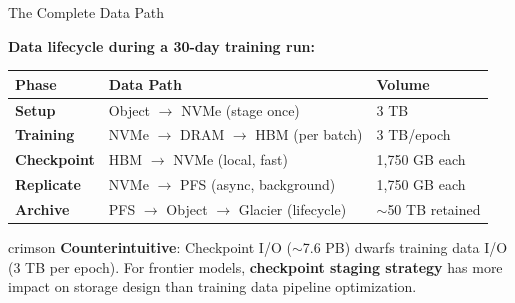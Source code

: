 \documentclass[aspectratio=169, 12pt]{beamer}
\begin{document}
\begin{frame}{The Complete Data Path}

\footnotesize
\textbf{Data lifecycle during a 30-day training run:}

\vspace{0.1cm}
\renewcommand{\arraystretch}{1.1}
{\scriptsize
\begin{tabular}{@{}lll@{}}
  \toprule
  \textbf{Phase} & \textbf{Data Path} & \textbf{Volume} \\
  \midrule
  \textbf{Setup}     & Object $\to$ NVMe (stage once)            & 3 TB \\
  \textbf{Training}  & NVMe $\to$ DRAM $\to$ HBM (per batch)     & 3 TB/epoch \\
  \textbf{Checkpoint} & HBM $\to$ NVMe (local, fast)              & 1,750 GB each \\
  \textbf{Replicate} & NVMe $\to$ PFS (async, background)         & 1,750 GB each \\
  \textbf{Archive}   & PFS $\to$ Object $\to$ Glacier (lifecycle) & $\sim$50 TB retained \\
  \bottomrule
\end{tabular}
}

\vspace{0.15cm}
\begin{mlsyscard}{crimson}
{\scriptsize \textbf{Counterintuitive}: Checkpoint I/O ($\sim$7.6 PB) dwarfs training data I/O (3 TB per epoch). For frontier models, \textbf{checkpoint staging strategy} has more impact on storage design than training data pipeline optimization.}
\end{mlsyscard}

\end{frame}
\end{document}
